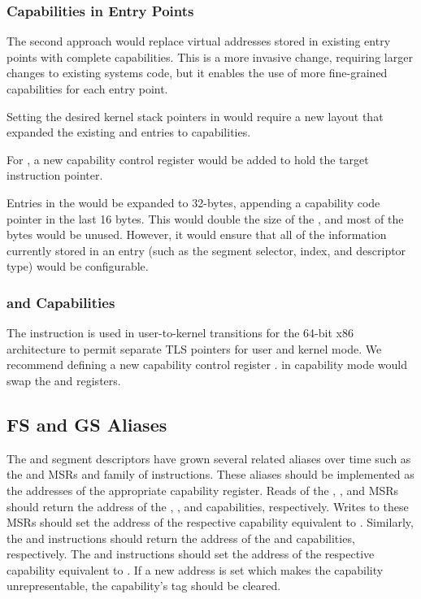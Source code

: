 \subsubsection{Capabilities in Entry Points}

The second approach would replace virtual addresses stored in
existing entry points with complete capabilities.  This is a more
invasive change, requiring larger changes to existing systems code, but
it enables the use of more fine-grained capabilities for each entry
point.

Setting the desired kernel stack pointers in \CSP{} would require a new
\TSS{} layout that expanded the existing \RSP{} and \IST{} entries to
capabilities.

For , a new capability control register \CSTAR{} would be
added to hold the target instruction pointer.

Entries in the \IDT{} would be expanded to 32-bytes, appending a capability
code pointer in the last 16 bytes.  This would double the size of the
\IDT{}, and most of the bytes would be unused.  However, it would
ensure that all of the information currently stored in an \IDT{} entry
(such as the segment selector, \IST{} index, and descriptor type) would
be configurable.

\subsubsection{ and Capabilities}

The  instruction is used in user-to-kernel
transitions for the 64-bit x86 architecture to permit separate TLS
pointers for user and kernel mode.  We recommend defining a new
capability control register \KGS{}.   in capability
mode would swap the \CGS{} and \KGS{} registers.

\subsection{FS and GS Aliases}

The \FS{} and \GS{} segment descriptors have grown several related
aliases over time such as the \FSBASE{} and \GSBASE{} MSRs and
 family of instructions.  These aliases should be
implemented as the addresses of the appropriate capability register.
Reads of the \FSBASE{}, \GSBASE{}, and \KGSBASE{} MSRs should return
the address of the \CFS{}, \CGS{}, and \KGS{} capabilities,
respectively.  Writes to these MSRs should set the address of the
respective capability equivalent to .  Similarly,
the  and  instructions should
return the address of the \CFS{} and \CGS{} capabilities,
respectively.  The  and 
instructions should set the address of the respective capability
equivalent to .  If a new address is set which makes
the capability unrepresentable, the capability's tag should be
cleared.

